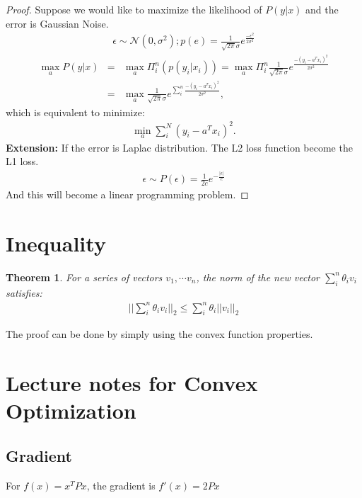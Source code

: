 \documentclass[12pt]{article}
\newtheorem{theorem}{Theorem}[section]
\begin{document}
\begin{proof}
	Suppose we would like to maximize the likelihood of $P(y|x)$ and the error is Gaussian Noise.
	\begin{eqnarray}
		\epsilon \sim \mathcal{N}(0, \sigma^2); p(e) = \frac{1}{\sqrt{2\pi}\sigma}e^{\frac{-\epsilon^2}{2\sigma^2}}
	\end{eqnarray}
	\begin{eqnarray}
		\max_{a} P(y|x)&=& \max_{a} \Pi_i^n (p(y_i|x_i)) = \max_a \Pi_i^n\frac{1}{\sqrt{2\pi}\sigma}e^{\frac{-(y_i - a^T x_i)^2}{2\sigma^2}}\\
		&=& \max_a \frac{1}{\sqrt{2\pi}\sigma}e^{\sum_i^n \frac{-(y_i - a^Tx_i)^2}{2\sigma^2}},
	\end{eqnarray}
	which is equivalent to minimize:
	\begin{eqnarray}
		\min_a \sum_i^N (y_i - a^Tx_i)^2.
	\end{eqnarray}
{\bf Extension: } If the error is Laplac distribution. The L2 loss function become the L1 loss.
\begin{eqnarray}
	\epsilon \sim P(\epsilon) = \frac{1}{2c} e^{-\frac{|\epsilon|}{c}}
\end{eqnarray}
And this will become a linear programming problem.
\end{proof}

\section{Inequality}
\begin{theorem}
	For a series of vectors $v_1, \cdots v_n$, the norm of the new vector $\sum_i^n \theta_i v_i$ satisfies:
	\begin{eqnarray}
		||\sum_i^n \theta_i v_i||_2 \le \sum_i^n \theta_i||v_i||_2
	\end{eqnarray}
\end{theorem}
The proof can be done by simply using the convex function properties.

\section{Lecture notes for Convex Optimization}
\subsection{Gradient}
For $f(x) = x^TPx$, the gradient is $f'(x) = 2Px$
\end{document}
